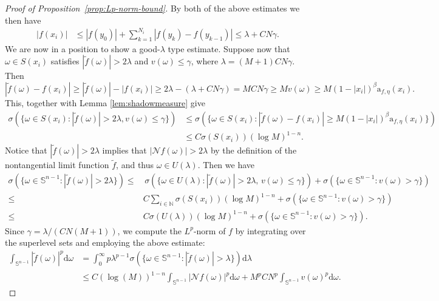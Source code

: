 \documentclass[11pt,a4paper,reqno]{amsart}
\theoremstyle{definition}
\newcommand{\om}{\omega}
\newcommand{\N}{\mathbb{N}}
\newcommand{\Nm}{\mathcal{N}}
\newcommand{\ud}{\mathrm {d}}
\newcommand{\Sn}{\mathbb{S}^{n-1}}
\numberwithin{komcounter}{section}
\begin{document}
\begin{proof}[Proof of Proposition~\ref{prop:Lp-norm-bound}]
By both of the above estimates we then have 
	\begin{align*}
		|f(x_i)|&\leq |f(y_0)|+\sum_{k=1}^{N_i}|f(y_k)-f(y_{k-1})|\leq \lambda +CN\gamma.
	\end{align*}
We are now in a position to show a good-$\lambda$ type estimate. Suppose now that $\om\in S(x_i)$ satisfies $|\tilde{f}(\om)|>2\lambda $ and $v(\om)\leq \gamma$, where $\lambda =(M+1)CN\gamma $. 
Then 
$$
 |\tilde{f}(\om)-f(x_i)|\geq |\tilde{f}(\om)|-|f(x_i)|\geq 2\lambda - (\lambda +CN\gamma )=MCN\gamma \geq M v(\om)\geq M (1-|x_i|)^\beta \mathrm a_{f,\eta }(x_i).
$$
This, together with Lemma \ref{lem:shadowmeasure} give
\begin{align*}
	\sigma (\{ \om \in S(x_i): |\tilde{f}(\om)|>2\lambda ,v(\om)\leq\gamma \})
		&\leq  \sigma (\{ \om\in S(x_i):|\tilde{f}(\om)-f(x_i)|\geq M (1-|x_i|)^\beta \mathrm a_{f,\eta }(x_i)  \})\\
		&\leq  C\sigma (S(x_i))(\log M)^{1-n}.
\end{align*}
Notice that $|\tilde{f}(\om)|>2\lambda$ implies that $|\Nm f(\om)|>2\lambda$ by the definition of the nontangential limit function $\tilde{f}$, and thus $\om\in U(\lambda )$. Then we have
\begin{align*}
\sigma (\{\om\in \Sn\!:\! |\tilde{f}(\om)|>2\lambda \})\leq &\, \sigma (\{ \om\in U(\lambda ): |\tilde{f}(\om)|>2\lambda,\, v(\om)\leq \gamma \}) +\sigma (\{ \om\in \Sn: v(\om) >\gamma  \}) \\
\leq\; &C\sum_{i\in\N}\sigma (S(x_i))(\log M)^{1-n} +\sigma (\{ \om\in \Sn: v(\om) >\gamma  \}) \\
\leq\; &C\sigma (U(\lambda ))(\log M)^{1-n} +\sigma (\{ \om\in \Sn: v(\om) >\gamma  \}) .
\end{align*}
Since $\gamma =\lambda /(CN(M+1))$, we compute the $L^p$-norm of $f$ by integrating over the superlevel sets and employing the above estimate:
\begin{align*}
\int_{\Sn}|\tilde{f}(\om)|^p \ud \om & = \int_{0}^{\infty} p \lambda^{p-1} \sigma (\{\om\in \Sn\!:\! |\tilde{f}(\om)|>\lambda \} ) \ud \lambda \\
& \leq C(\log (M))^{1-n}\int_{\Sn}|\Nm f(\om)|^p \ud \om + M^pCN^p\int_{\Sn}v(\om)^p \ud \om.
\end{align*}
	

\end{proof}
\end{document}
